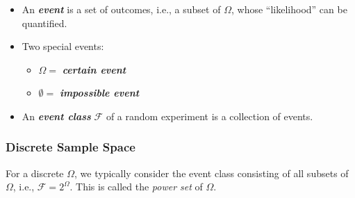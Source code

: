 \begin{itemize}
\item An \textit{\textbf{event}} is a set of outcomes, i.e., a subset of $\Omega$,
whose ``likelihood'' can be quantified.
\item Two special events:

\begin{itemize}
\item $\Omega =$ \textit{\textbf{certain event}}
\item $\emptyset =$ \textit{\textbf{impossible event}}
\end{itemize}


\item An \textit{\textbf{event class}} $\mathcal{F}$ of a random experiment is a collection of events.
\end{itemize}

\subsubsection{Discrete Sample Space}

For a discrete $\Omega$, we typically consider the event class
consisting of all subsets of $\Omega$, i.e.,
$\mathcal{F} = 2^\Omega.$
This is called the \textit{power set} of $\Omega$.

